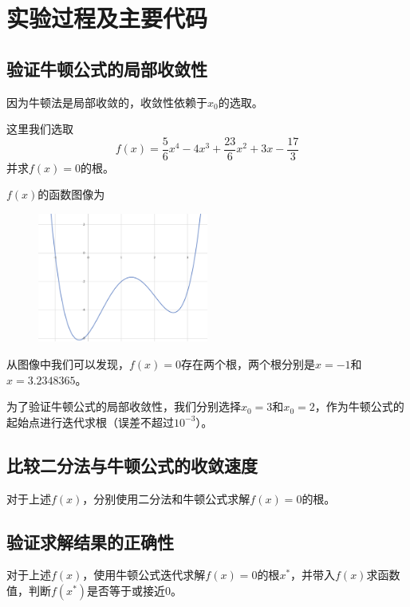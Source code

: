 \documentclass[lang=cn,11pt,a4paper]{elegantpaper}
\begin{document}
\section{实验过程及主要代码}
\subsection{验证牛顿公式的局部收敛性}
  因为牛顿法是局部收敛的，收敛性依赖于$x_0$的选取。

  这里我们选取
  \begin{equation}
    f(x)=\frac{5}{6}x^4-4x^3+\frac{23}{6}x^2+3x-\frac{17}{3}
  \end{equation}
  并求$f(x)=0$的根。

  $f(x)$的函数图像为

  \begin{figure}[htbp]
    \centering
    \includegraphics[width=0.5\textwidth]{image/f.png}
  \end{figure}
  
  从图像中我们可以发现，$f(x)=0$存在两个根，两个根分别是$x=-1$和$x=3.2348365$。

  为了验证牛顿公式的局部收敛性，我们分别选择$x_0=3$和$x_0=2$，作为牛顿公式的起始点进行迭代求根（误差不超过$10^{-3}$）。

\subsection{比较二分法与牛顿公式的收敛速度}
  对于上述$f(x)$，分别使用二分法和牛顿公式求解$f(x)=0$的根。

\subsection{验证求解结果的正确性}
  对于上述$f(x)$，使用牛顿公式迭代求解$f(x)=0$的根$x^*$，并带入$f(x)$求函数值，判断$f(x^*)$是否等于或接近$0$。
\end{document}
